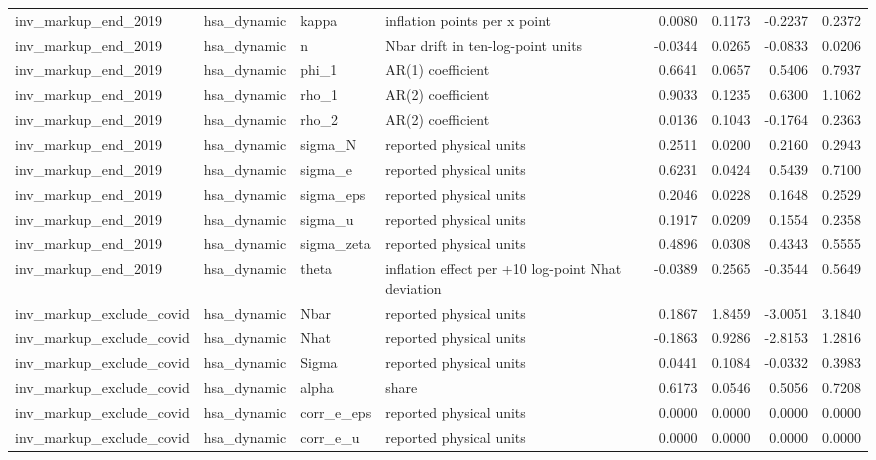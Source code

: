 \begin{tabular}{llllrrrr}
inv\_markup\_end\_2019 & hsa\_dynamic & kappa & inflation points per x point & 0.0080 & 0.1173 & -0.2237 & 0.2372 \\
inv\_markup\_end\_2019 & hsa\_dynamic & n & Nbar drift in ten-log-point units & -0.0344 & 0.0265 & -0.0833 & 0.0206 \\
inv\_markup\_end\_2019 & hsa\_dynamic & phi\_1 & AR(1) coefficient & 0.6641 & 0.0657 & 0.5406 & 0.7937 \\
inv\_markup\_end\_2019 & hsa\_dynamic & rho\_1 & AR(2) coefficient & 0.9033 & 0.1235 & 0.6300 & 1.1062 \\
inv\_markup\_end\_2019 & hsa\_dynamic & rho\_2 & AR(2) coefficient & 0.0136 & 0.1043 & -0.1764 & 0.2363 \\
inv\_markup\_end\_2019 & hsa\_dynamic & sigma\_N & reported physical units & 0.2511 & 0.0200 & 0.2160 & 0.2943 \\
inv\_markup\_end\_2019 & hsa\_dynamic & sigma\_e & reported physical units & 0.6231 & 0.0424 & 0.5439 & 0.7100 \\
inv\_markup\_end\_2019 & hsa\_dynamic & sigma\_eps & reported physical units & 0.2046 & 0.0228 & 0.1648 & 0.2529 \\
inv\_markup\_end\_2019 & hsa\_dynamic & sigma\_u & reported physical units & 0.1917 & 0.0209 & 0.1554 & 0.2358 \\
inv\_markup\_end\_2019 & hsa\_dynamic & sigma\_zeta & reported physical units & 0.4896 & 0.0308 & 0.4343 & 0.5555 \\
inv\_markup\_end\_2019 & hsa\_dynamic & theta & inflation effect per +10 log-point Nhat deviation & -0.0389 & 0.2565 & -0.3544 & 0.5649 \\
inv\_markup\_exclude\_covid & hsa\_dynamic & Nbar & reported physical units & 0.1867 & 1.8459 & -3.0051 & 3.1840 \\
inv\_markup\_exclude\_covid & hsa\_dynamic & Nhat & reported physical units & -0.1863 & 0.9286 & -2.8153 & 1.2816 \\
inv\_markup\_exclude\_covid & hsa\_dynamic & Sigma & reported physical units & 0.0441 & 0.1084 & -0.0332 & 0.3983 \\
inv\_markup\_exclude\_covid & hsa\_dynamic & alpha & share & 0.6173 & 0.0546 & 0.5056 & 0.7208 \\
inv\_markup\_exclude\_covid & hsa\_dynamic & corr\_e\_eps & reported physical units & 0.0000 & 0.0000 & 0.0000 & 0.0000 \\
inv\_markup\_exclude\_covid & hsa\_dynamic & corr\_e\_u & reported physical units & 0.0000 & 0.0000 & 0.0000 & 0.0000 \\

\end{tabular}
